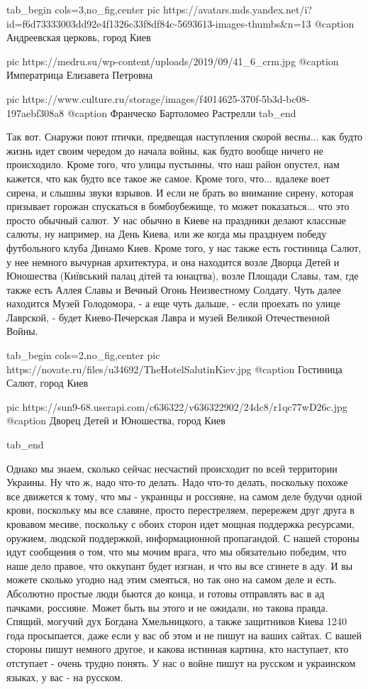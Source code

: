 \ifcmt
  tab_begin cols=3,no_fig,center
     pic https://avatars.mds.yandex.net/i?id=f6d73333003dd92e4f1326c33f8df84c-5693613-images-thumbs&n=13
		 @caption Андреевская церковь, город Киев

		 pic https://medru.su/wp-content/uploads/2019/09/41_6_crm.jpg
		 @caption Императрица Елизавета Петровна

		 pic https://www.culture.ru/storage/images/f4014625-370f-5b3d-bc08-197aebf308a8
		 @caption Франческо Бартоломео Растрелли
  tab_end
\fi

Так вот. Снаружи поют птички, предвещая наступления скорой весны... как будто
жизнь идет своим чередом до начала войны, как будто вообще ничего не
происходило. Кроме того, что улицы пустынны, что наш район опустел, нам
кажется, что как будто все такое же самое. Кроме того, что... вдалеке воет
сирена, и слышны звуки взрывов.  И если не брать во внимание сирену, которая
призывает горожан спускаться в бомбоубежище, то может показаться... что это
просто обычный салют. У нас обычно в Киеве на праздники делают классные салюты,
ну например, на День Киева, или же когда мы празднуем победу футбольного клуба
Динамо Киев. Кроме того, у нас также есть гостиница Салют, у нее немного
вычурная архитектура, и она находится возле Дворца Детей и Юношества (Київський
палац дітей та юнацтва), возле Площади Славы, там, где также есть Аллея Славы и
Вечный Огонь Неизвестному Солдату. Чуть далее находится Музей Голодомора, - а
еще чуть дальше, - если проехать по улице Лаврской, - будет Киево-Печерская
Лавра и музей Великой Отечественной Войны.

\ifcmt
  tab_begin cols=2,no_fig,center
		 pic https://novate.ru/files/u34692/TheHotelSalutinKiev.jpg
		 @caption Гостиница Салют, город Киев

		 pic https://sun9-68.userapi.com/c636322/v636322902/24dc8/r1qc77wD26c.jpg
		 @caption Дворец Детей и Юношества, город Киев

  tab_end
\fi

Однако мы знаем, сколько сейчас несчастий происходит по всей территории
Украины. Ну что ж, надо что-то делать. Надо что-то делать, поскольку похоже все
движется к тому, что мы - украинцы и россияне, на самом деле будучи одной
крови, поскольку мы все славяне, просто перестреляем, перережем друг друга в
кровавом месиве, поскольку с обоих сторон идет мощная поддержка ресурсами,
оружием, людской поддержкой, информационной пропагандой. С нашей стороны идут
сообщения о том, что мы мочим врага, что мы обязательно победим, что наше дело
правое, что оккупант будет изгнан, и что вы все сгинете в аду. И вы можете
сколько угодно над этим смеяться, но так оно на самом деле и есть. Абсолютно
простые люди бьются до конца, и готовы отправлять вас в ад пачками, россияне.
Может быть вы этого и не ожидали, но такова правда.  Спящий, могучий дух
Богдана Хмельницкого, а также защитников Киева 1240 года просыпается, даже если
у вас об этом и не пишут на ваших сайтах. С вашей стороны пишут немного другое,
и какова истинная картина, кто наступает, кто отступает - очень трудно понять.
У нас о войне пишут на русском и украинском языках, у вас - на русском.

